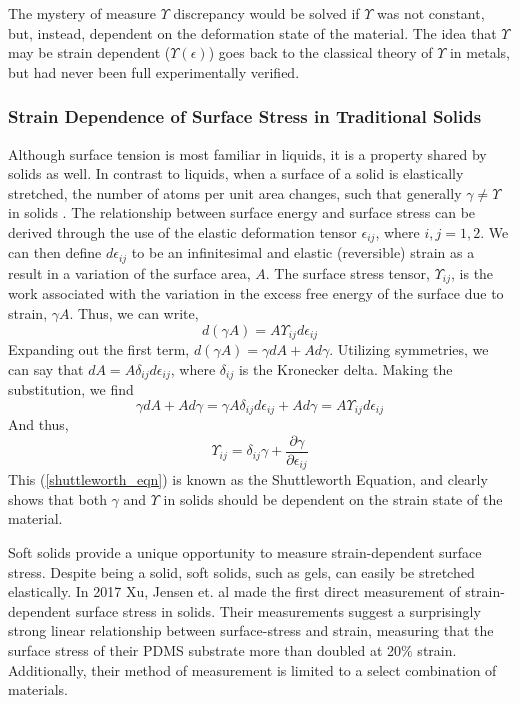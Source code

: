 The mystery of measure $ \Upsilon $ discrepancy would be solved if $ \Upsilon $ was not constant, but, instead, dependent on the deformation state of the material. The idea that $ \Upsilon $ may be strain dependent ($ \Upsilon(\epsilon) $) goes back to the classical theory of $ \Upsilon $ in metals, but had never been full experimentally verified. 

\subsubsection{Strain Dependence of Surface Stress in Traditional Solids}
Although surface tension is most familiar in liquids, it is a property shared by solids as well.  In contrast to liquids, when a surface of a solid is elastically stretched, the number of atoms per unit area changes, such that generally $ \gamma \neq \Upsilon$ in solids \cite{cammarata1994surface}. The relationship between surface energy and surface stress can be derived through the use of the elastic deformation tensor $\epsilon_{ij}$, where $i,j=1,2$. We can then define $d\epsilon_{ij}$ to be an infinitesimal and elastic (reversible) strain as a result in a variation of the surface area, $A$. The surface stress tensor, $\Upsilon_{ij}$, is the work associated with the variation in the excess free energy of the surface due to strain, $\gamma A$. Thus, we can write, \[d(\gamma A) = A \Upsilon_{ij} d\epsilon_{ij}\] Expanding out the first term, $d(\gamma A) = \gamma dA + A d\gamma$. Utilizing symmetries, we can say that $dA = A \delta_{ij} d\epsilon_{ij}$, where $\delta_{ij}$ is the Kronecker delta. Making the substitution, we find \[\gamma dA + A d\gamma = \gamma A \delta_{ij} d\epsilon_{ij} + A d\gamma = A \Upsilon_{ij} d\epsilon_{ij}\] And thus,
\begin{equation}
\label{shuttleworth_eqn}
\Upsilon_{ij} = \delta_{ij}\gamma + \frac{\partial \gamma}{\partial \epsilon_{ij}} 
\end{equation}
This (\ref{shuttleworth_eqn}) is known as the Shuttleworth Equation, and clearly shows that both $\gamma$ and $\Upsilon$ in solids should be dependent on the strain state of the material.

Soft solids provide a unique opportunity to measure strain-dependent surface stress. Despite being a solid, soft solids, such as gels, can easily be stretched elastically. In 2017 Xu, Jensen et. al \cite{xu2017direct} made the first direct measurement of strain-dependent surface stress in solids. Their measurements suggest a surprisingly strong linear relationship between surface-stress and strain, measuring that the surface stress of their PDMS substrate more than doubled at 20\% strain. Additionally, their method of measurement is limited to a select combination of materials. 

